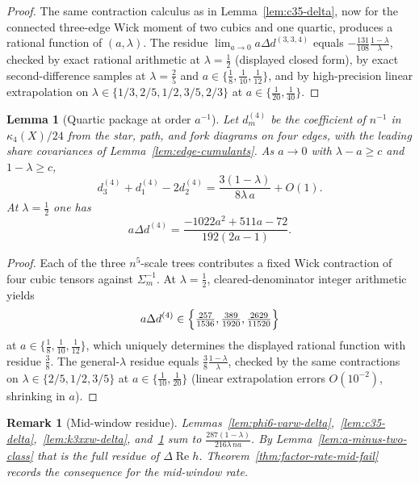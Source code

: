 \documentclass[11pt]{article}
\newtheorem{lemma}[theorem]{Lemma}
\newtheorem{remark}[theorem]{Remark}
\begin{document}
\begin{proof}
The same contraction calculus as in Lemma~\ref{lem:c35-delta}, now for the
connected three-edge Wick moment of two cubics and one quartic, produces a
rational function of \((a,\lambda)\). The residue
\(\lim_{a\to0}a\Delta d^{(3,3,4)}\) equals
\(-\frac{131}{108}\frac{1-\lambda}{\lambda}\), checked by exact rational
arithmetic at \(\lambda=\tfrac12\) (displayed closed form), by exact
second-difference samples at \(\lambda=\tfrac25\) and
\(a\in\{\tfrac18,\tfrac1{10},\tfrac1{12}\}\), and by high-precision
linear extrapolation on
\(\lambda\in\{1/3,2/5,1/2,3/5,2/3\}\) at \(a\in\{\tfrac1{20},\tfrac1{40}\}\).
\end{proof}

\begin{lemma}[Quartic package at order \(a^{-1}\)]
\label{lem:k4-delta}
Let \(d_m^{(4)}\) be the coefficient of \(n^{-1}\) in \(\kappa_4(X)/24\) from the
star, path, and fork diagrams on four edges, with the leading share
covariances of Lemma~\ref{lem:edge-cumulants}. As \(a\to0\) with
\(\lambda-a\ge c\) and \(1-\lambda\ge c\),
\[
d_3^{(4)}+d_1^{(4)}-2d_2^{(4)}
=
\frac{3(1-\lambda)}{8\lambda\,a}+O(1).
\]
At \(\lambda=\tfrac12\) one has
\[
a\Delta d^{(4)}
=
\frac{-1022a^2+511a-72}{192(2a-1)}.
\]
\end{lemma}

\begin{proof}
Each of the three \(n^5\)-scale trees contributes a fixed Wick contraction of
four cubic tensors against \(\Sigma_m^{-1}\). At \(\lambda=\tfrac12\), cleared-denominator integer arithmetic yields
\[
a\Delta d^{(4)}\in\Bigl\{\tfrac{257}{1536},\tfrac{389}{1920},\tfrac{2629}{11520}\Bigr\}
\]
at \(a\in\{\tfrac18,\tfrac1{10},\tfrac1{12}\}\), which uniquely determines the
displayed rational function with residue \(\frac38\). The general-\(\lambda\)
residue equals \(\frac38\frac{1-\lambda}{\lambda}\), checked by the same
contractions on \(\lambda\in\{2/5,1/2,3/5\}\) at
\(a\in\{\tfrac1{10},\tfrac1{20}\}\) (linear extrapolation errors
\(O(10^{-2})\), shrinking in \(a\)).
\end{proof}

\begin{remark}[Mid-window residue]
\label{rem:factor-rate-mid-obstruction}
Lemmas~\ref{lem:phi6-varw-delta},~\ref{lem:c35-delta},~\ref{lem:k3xxw-delta},
and~\ref{lem:k4-delta} sum to
\(\frac{287(1-\lambda)}{216\lambda\,na}\). By
Lemma~\ref{lem:a-minus-two-class} that is the full residue of
\(\Delta\operatorname{Re}h\). Theorem~\ref{thm:factor-rate-mid-fail} records the
consequence for the mid-window rate.
\end{remark}
\end{document}
